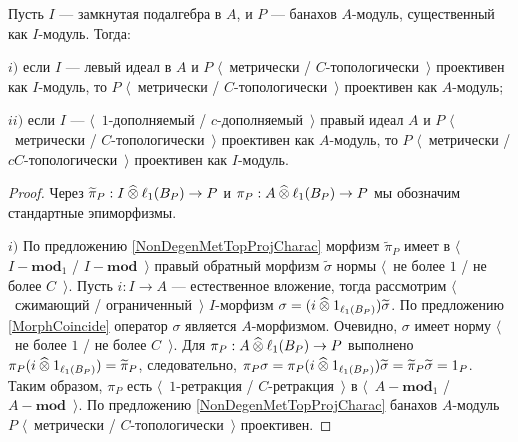 \begin{proposition}\label{MetTopProjUnderChangeOfAlg} Пусть $I$ --- замкнутая подалгебра в $A$, и $P$ --- банахов $A$-модуль, существенный как $I$-модуль. Тогда:

$i)$ если $I$ --- левый идеал в $A$ и $P$ $\langle$~метрически / $C$-топологически~$\rangle$ проективен как $I$-модуль, то $P$ $\langle$~метрически / $C$-топологически~$\rangle$ проективен как $A$-модуль;

$ii)$ если $I$ --- $\langle$~$1$-дополняемый / $c$-дополняемый~$\rangle$ правый идеал $A$ и $P$ $\langle$~метрически / $C$-топологически~$\rangle$ проективен как $A$-модуль, то $P$ $\langle$~метрически / $cC$-топологически~$\rangle$ проективен как $I$-модуль.
\end{proposition}
\begin{proof} Через $\widetilde{\pi}_P: I\mathbin{\widehat{\otimes}} \ell_1(B_P)\to P$ и $\pi_P:A\mathbin{\widehat{\otimes}} \ell_1(B_P)\to P$ мы обозначим стандартные эпиморфизмы.

$i)$ По предложению \ref{NonDegenMetTopProjCharac} морфизм $\widetilde{\pi}_P$ имеет в $\langle$~$I-\mathbf{mod}_1$ / $I-\mathbf{mod}$~$\rangle$ правый обратный морфизм  $\widetilde{\sigma}$ нормы $\langle$~не более $1$ / не более $C$~$\rangle$. Пусть $i:I\to A$ --- естественное вложение, тогда рассмотрим $\langle$~сжимающий / ограниченный~$\rangle$ $I$-морфизм $\sigma=(i\mathbin{\widehat{\otimes}} 1_{\ell_1(B_P)})\widetilde{\sigma}$. По предложению \ref{MorphCoincide} оператор $\sigma$ является $A$-морфизмом. Очевидно, $\sigma$ имеет норму $\langle$~не более $1$ / не более $C$~$\rangle$. Для $\pi_P:A\mathbin{\widehat{\otimes}} \ell_1(B_P)\to P$ выполнено $\pi_P(i\mathbin{\widehat{\otimes}} 1_{\ell_1(B_P)})=\widetilde{\pi}_P$, следовательно, $\pi_P\sigma=\pi_P(i\mathbin{\widehat{\otimes}} 1_{\ell_1(B_P)})\widetilde{\sigma}=\widetilde{\pi}_P\widetilde{\sigma}=1_P$. Таким образом, $\pi_P$ есть $\langle$~$1$-ретракция / $C$-ретракция~$\rangle$ в $\langle$~$A-\mathbf{mod}_1$ / $A-\mathbf{mod}$~$\rangle$. По предложению \ref{NonDegenMetTopProjCharac} банахов $A$-модуль $P$ $\langle$~метрически / $C$-топологически~$\rangle$ проективен.


\end{proof}

